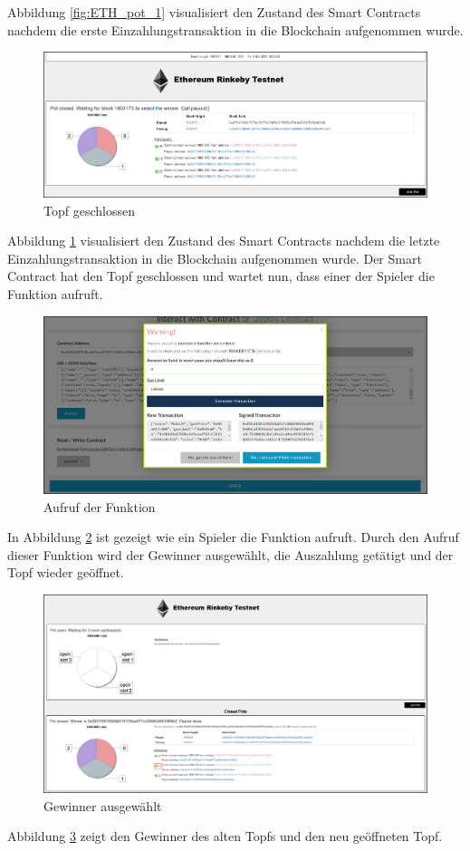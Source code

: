 Abbildung \ref{fig:ETH_pot_1} visualisiert den Zustand des Smart Contracts nachdem die erste Einzahlungstransaktion in die Blockchain aufgenommen wurde.

\begin{figure}[H]
\centering
\includegraphics[width=1\linewidth]{Figures/eth_gui/ETH_pot_closed}
\decoRule
\caption{Topf geschlossen}
\label{fig:ETH_pot_closed}
\end{figure}

Abbildung \ref{fig:ETH_pot_closed} visualisiert den Zustand des Smart Contracts nachdem die letzte Einzahlungstransaktion in die Blockchain aufgenommen wurde. Der Smart Contract hat den Topf geschlossen und wartet nun, dass einer der Spieler die  Funktion aufruft.

\begin{figure}[H]
\centering
\includegraphics[width=1\linewidth]{Figures/eth_gui/ETH_wallet_payout}
\decoRule
\caption{Aufruf der  Funktion}
\label{fig:ETH_wallet_payout}
\end{figure}

In Abbildung \ref{fig:ETH_wallet_payout} ist gezeigt wie ein Spieler die   Funktion aufruft. Durch den Aufruf dieser Funktion wird der Gewinner ausgewählt, die Auszahlung getätigt und der Topf wieder geöffnet.

\begin{figure}[H]
\centering
\includegraphics[width=1\linewidth]{Figures/eth_gui/ETH_pot_finished}
\decoRule
\caption{Gewinner ausgewählt}
\label{fig:ETH_pot_finished}
\end{figure}

Abbildung \ref{fig:ETH_pot_finished} zeigt den Gewinner des alten Topfs und den neu geöffneten Topf.